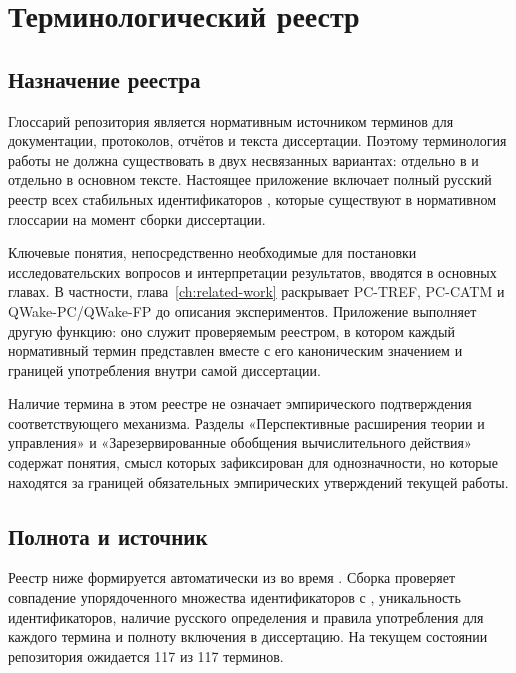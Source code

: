 \chapter{Терминологический реестр}
\label{app:terminology}

\section{Назначение реестра}

Глоссарий репозитория является нормативным источником терминов для
документации, протоколов, отчётов и текста диссертации. Поэтому терминология
работы не должна существовать в двух несвязанных вариантах: отдельно в
 и отдельно в основном тексте. Настоящее приложение
включает полный русский реестр всех стабильных идентификаторов ,
которые существуют в нормативном глоссарии на момент сборки диссертации.

Ключевые понятия, непосредственно необходимые для постановки исследовательских
вопросов и интерпретации результатов, вводятся в основных главах. В частности,
глава~\ref{ch:related-work} раскрывает PC-TREF, PC-CATM и QWake-PC/QWake-FP до
описания экспериментов. Приложение выполняет другую функцию: оно служит
проверяемым реестром, в котором каждый нормативный термин представлен вместе с
его каноническим значением и границей употребления внутри самой диссертации.

Наличие термина в этом реестре не означает эмпирического подтверждения
соответствующего механизма. Разделы «Перспективные расширения теории и
управления» и «Зарезервированные обобщения вычислительного действия» содержат
понятия, смысл которых зафиксирован для однозначности, но которые находятся за
границей обязательных эмпирических утверждений текущей работы.

\section{Полнота и источник}

Реестр ниже формируется автоматически из  во время
. Сборка проверяет совпадение упорядоченного множества
идентификаторов с , уникальность идентификаторов,
наличие русского определения и правила употребления для каждого термина и
полноту включения в диссертацию. На текущем состоянии репозитория ожидается
117 из 117 терминов.


